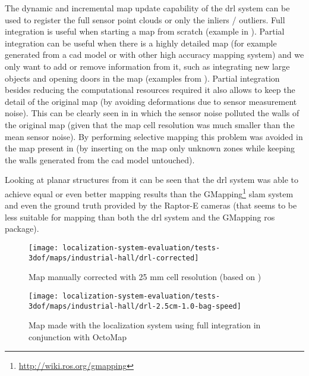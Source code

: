 The dynamic and incremental map update capability of the \gls{drl} system can be used to register the full sensor point clouds or only the inliers / outliers. Full integration is useful when starting a map from scratch (example in ). Partial integration can be useful when there is a highly detailed map (for example generated from a \gls{cad} model or with other high accuracy mapping system) and we only want to add or remove information from it, such as integrating new large objects and opening doors in the map (examples from ). Partial integration besides reducing the computational resources required it also allows to keep the detail of the original map (by avoiding deformations due to sensor measurement noise). This can be clearly seen in  in which the sensor noise polluted the walls of the original map (given that the map cell resolution was much smaller than the mean sensor noise). By performing selective mapping this problem was avoided in the map present in  (by inserting on the map only unknown zones while keeping the walls generated from the \gls{cad} model untouched).

Looking at planar structures from  it can be seen that the \gls{drl} system was able to achieve equal or even better mapping results than the GMapping\footnote{\url{http://wiki.ros.org/gmapping}} \gls{slam} system and even the ground truth provided by the Raptor-E cameras (that seems to be less suitable for mapping than both the \gls{drl} system and the GMapping \gls{ros} package).

\begin{figure}[H]
	\centering
	\texttt{[image: localization-system-evaluation/tests-3dof/maps/industrial-hall/drl-corrected]}
	\caption{Map manually corrected with 25 mm cell resolution (based on ) }
	\label{fig:localization-system-evaluation_drl-corrected}
\end{figure}

\begin{figure}[H]
	\centering
	\texttt{[image: localization-system-evaluation/tests-3dof/maps/industrial-hall/drl-2.5cm-1.0-bag-speed]}
	\caption{Map made with the localization system using full integration in conjunction with OctoMap}
	\label{fig:localization-system-evaluation_drl-2.5cm-1.0-bag-speed}
\end{figure}



